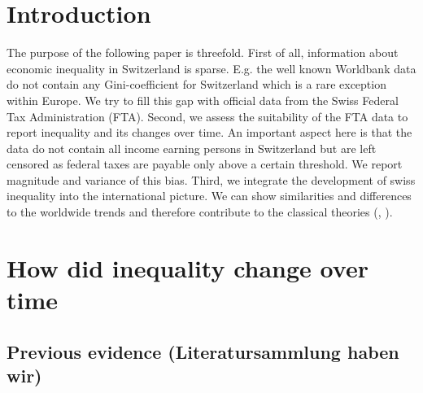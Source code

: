 \documentclass[twoside]{article}\usepackage[]{graphicx}\usepackage[]{color}
\begin{document}
\begin{multicols}{2} %




\section{Introduction}

The purpose of the following paper is threefold. First of all, information about economic inequality in Switzerland is sparse. E.g. the well known Worldbank data do not contain any Gini-coefficient for Switzerland which is a rare exception within Europe. We try to fill this gap with official data from the Swiss Federal Tax Administration (FTA). Second, we assess the suitability of the FTA data to report inequality and its changes over time. An important aspect here is that the data do not contain all income earning persons in Switzerland but are left censored as federal taxes are payable only above a certain threshold. We report magnitude and variance of this bias. Third, we integrate the development of swiss inequality into the international picture. We can show similarities and differences to the worldwide trends and therefore contribute to the classical theories (\cite{kuznets1955economic}, \cite{nielsen_kuznets_1997}).






\section{How did inequality change over time}

\subsection{Previous evidence (Literatursammlung haben wir)}


\end{multicols}
\end{document}
